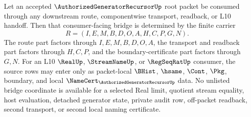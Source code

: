 \begin{lemma}
\label{lem:authorized-generator-recursor-root-authorization-bridge-determinacy}
Let an accepted $\AuthorizedGeneratorRecursorUp$ root packet be consumed through any downstream route, componentwise transport, readback, or L10 handoff. Then that consumer-facing bridge is determined by the finite carrier
$$
R=(I,E,M,B,D,O,A,H,C,P,G,N).
$$
The route part factors through $I,E,M,B,D,O,A$, the transport and readback part factors through $H,C,P$, and the boundary-certificate part factors through $G,N$. For an L10 $\RealUp$, $\StreamNameUp$, or $\RegSeqRatUp$ consumer, the source rows may enter only as packet-local $\BHist$, $\hsame$, $\Cont$, $\Pkg$, boundary, and local $\NameCert_{\AuthorizedGeneratorRecursorUp}$ data. No unlisted bridge coordinate is available for a selected Real limit, quotient stream equality, host evaluation, detached generator state, private audit row, off-packet readback, second transport, or second local naming certificate.
\end{lemma}
